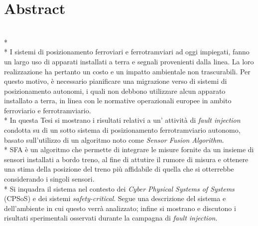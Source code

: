 \documentclass[10pt,a4paper]{article}
\begin{document}
\section{Abstract}\mbox{}\\*\\*
I sistemi di posizionamento ferroviari e ferrotramviari ad oggi impiegati, fanno un largo uso di apparati installati a terra e segnali provenienti dalla linea. La loro realizzazione ha pertanto un costo e un impatto ambientale non trascurabili. Per questo motivo, \`e necessario pianificare una migrazione verso di sistemi di posizionamento autonomi, i quali non debbono utilizzare alcun apparato installato a terra, in linea con le normative operazionali europee in ambito ferroviario e ferrotramviario.\\*
	In questa Tesi si mostrano i risultati relativi a un' attivit\`a di \emph{fault injection} condotta su di un sotto sistema di posizionamento ferrotramviario autonomo, basato sull'utilizzo di un algoritmo noto come \emph{Sensor Fusion Algorithm}.\\*
	SFA \`e un algoritmo che permette di integrare le misure fornite da un insieme di sensori installati a bordo treno, al fine di attutire il rumore di misura e ottenere una stima della posizione del treno pi\`u affidabile di quella che si otterrebbe considerando i singoli sensori.\\*
	Si inquadra il sistema nel contesto dei \emph{Cyber Physical Systems of Systems} (CPSoS) e dei sistemi \emph{safety-critical}. Segue una descrizione del sistema e dell'ambiente in cui questo verr\`a analizzato; infine si mostrano e discutono i risultati sperimentali osservati durante la campagna di \emph{fault injection}.
\end{document}

